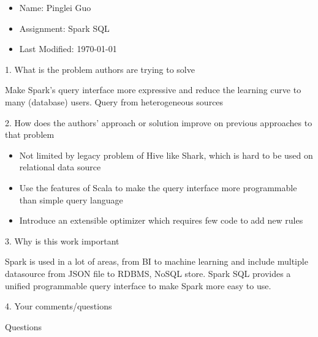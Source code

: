 \documentclass[12pt,a4paper,oneside]{article}
\begin{document}
\begin{itemize}
  \item Name: Pinglei Guo
  \item Assignment: Spark SQL
  \item Last Modified: \today
\end{itemize}

1. What is the problem authors are trying to solve

\medskip

Make Spark's query interface more expressive and reduce the learning curve to many (database) users.
Query from heterogeneous sources

\bigskip

2. How does the authors’ approach or solution improve on previous approaches to that problem

\medskip

\begin{itemize}
   \item Not limited by legacy problem of Hive like Shark, which is hard to be used on relational data source
   \item Use the features of Scala to make the query interface more programmable than simple query language
   \item Introduce an extensible optimizer which requires few code to add new rules
\end{itemize}

\bigskip

3. Why is this work important

\medskip

Spark is used in a lot of areas, from BI to machine learning and include multiple datasource from JSON file to
RDBMS, NoSQL store. Spark SQL provides a unified programmable query interface to make Spark more easy to use.

\bigskip

4. Your comments/questions

\medskip

Questions
\end{document}
